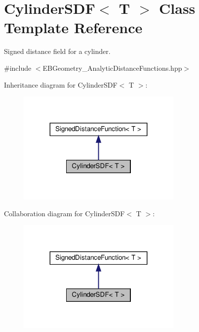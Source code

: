 \hypertarget{classCylinderSDF}{}\section{Cylinder\+S\+DF$<$ T $>$ Class Template Reference}
\label{classCylinderSDF}


Signed distance field for a cylinder.  




{\ttfamily \#include $<$E\+B\+Geometry\+\_\+\+Analytic\+Distance\+Functions.\+hpp$>$}



Inheritance diagram for Cylinder\+S\+DF$<$ T $>$\+:
\nopagebreak
\begin{figure}[H]
\begin{center}
\leavevmode
\includegraphics[width=227pt]{classCylinderSDF__inherit__graph}
\end{center}
\end{figure}


Collaboration diagram for Cylinder\+S\+DF$<$ T $>$\+:
\nopagebreak
\begin{figure}[H]
\begin{center}
\leavevmode
\includegraphics[width=227pt]{classCylinderSDF__coll__graph}
\end{center}
\end{figure}
